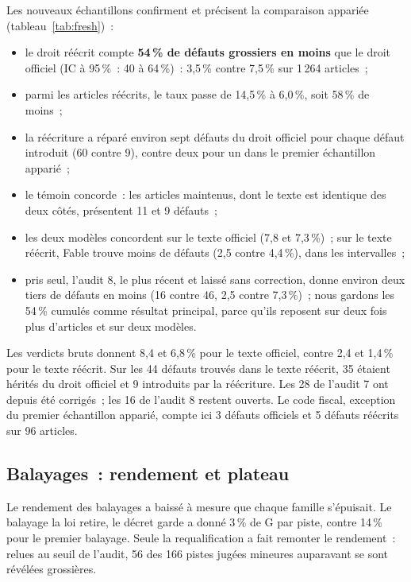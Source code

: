 \documentclass[11pt,a4paper]{article}
\begin{document}
Les nouveaux échantillons confirment et précisent la comparaison appariée (tableau~\ref{tab:fresh})~:
\begin{itemize}
  \item le droit réécrit compte \textbf{54\,\% de défauts grossiers en moins} que le droit officiel (IC à 95\,\%~: 40 à 64\,\%)~: 3,5\,\% contre 7,5\,\% sur 1\,264 articles~;
  \item parmi les articles réécrits, le taux passe de 14,5\,\% à 6,0\,\%, soit 58\,\% de moins~;
  \item la réécriture a réparé environ sept défauts du droit officiel pour chaque défaut introduit (60 contre 9), contre deux pour un dans le premier échantillon apparié~;
  \item le témoin concorde~: les articles maintenus, dont le texte est identique des deux côtés, présentent 11 et 9 défauts~;
  \item les deux modèles concordent sur le texte officiel (7,8 et 7,3\,\%)~; sur le texte réécrit, Fable trouve moins de défauts (2,5 contre 4,4\,\%), dans les intervalles~;
  \item pris seul, l'audit 8, le plus récent et laissé sans correction, donne environ deux tiers de défauts en moins (16 contre 46, 2,5 contre 7,3\,\%)~; nous gardons les 54\,\% cumulés comme résultat principal, parce qu'ils reposent sur deux fois plus d'articles et sur deux modèles.
\end{itemize}
Les verdicts bruts donnent 8,4 et 6,8\,\% pour le texte officiel, contre 2,4 et 1,4\,\% pour le texte réécrit. Sur les 44 défauts trouvés dans le texte réécrit, 35 étaient hérités du droit officiel et 9 introduits par la réécriture. Les 28 de l'audit 7 ont depuis été corrigés~; les 16 de l'audit 8 restent ouverts. Le code fiscal, exception du premier échantillon apparié, compte ici 3 défauts officiels et 5 défauts réécrits sur 96 articles.

\subsection{Balayages~: rendement et plateau}

Le rendement des balayages a baissé à mesure que chaque famille s'épuisait. Le balayage \og la loi retire, le décret garde \fg{} a donné 3\,\% de G par piste, contre 14\,\% pour le premier balayage. Seule la requalification a fait remonter le rendement~: relues au seuil de l'audit, 56 des 166 pistes jugées mineures auparavant se sont révélées grossières.
\end{document}
